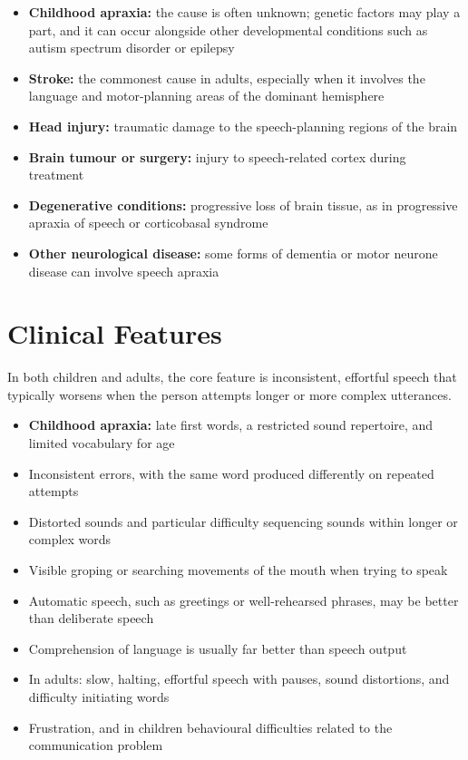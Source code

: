 \begin{itemize}
    \item \textbf{Childhood apraxia:} the cause is often unknown; genetic factors may play a part, and it can occur alongside other developmental conditions such as autism spectrum disorder or epilepsy
    \item \textbf{Stroke:} the commonest cause in adults, especially when it involves the language and motor-planning areas of the dominant hemisphere
    \item \textbf{Head injury:} traumatic damage to the speech-planning regions of the brain
    \item \textbf{Brain tumour or surgery:} injury to speech-related cortex during treatment
    \item \textbf{Degenerative conditions:} progressive loss of brain tissue, as in progressive apraxia of speech or corticobasal syndrome
    \item \textbf{Other neurological disease:} some forms of dementia or motor neurone disease can involve speech apraxia
\end{itemize}

\section*{Clinical Features}
In both children and adults, the core feature is inconsistent, effortful speech that typically worsens when the person attempts longer or more complex utterances.

\begin{itemize}
    \item \textbf{Childhood apraxia:} late first words, a restricted sound repertoire, and limited vocabulary for age
    \item Inconsistent errors, with the same word produced differently on repeated attempts
    \item Distorted sounds and particular difficulty sequencing sounds within longer or complex words
    \item Visible groping or searching movements of the mouth when trying to speak
    \item Automatic speech, such as greetings or well-rehearsed phrases, may be better than deliberate speech
    \item Comprehension of language is usually far better than speech output
    \item In adults: slow, halting, effortful speech with pauses, sound distortions, and difficulty initiating words
    \item Frustration, and in children behavioural difficulties related to the communication problem
\end{itemize}

